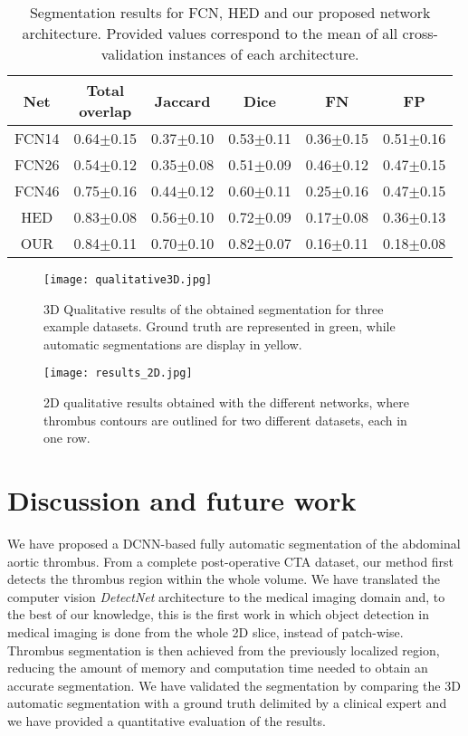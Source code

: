 \documentclass[preprint,authoryear,12pt]{elsarticle}
\begin{document}
\begin{table}[htb]
\centering
\begin{tabular}{c|c|c|c|c|c}
\hline
Net & \thead{Total \\ overlap} & Jaccard & Dice & FN & FP \\
\hline
FCN14 & 0.64\(\pm\)0.15 & 0.37\(\pm\)0.10 & 0.53\(\pm\)0.11 & 0.36\(\pm\)0.15 & 0.51\(\pm\)0.16 \\
FCN26 & 0.54\(\pm\)0.12 & 0.35\(\pm\)0.08 &  0.51\(\pm\)0.09 & 0.46\(\pm\)0.12 & 0.47\(\pm\)0.15\\
FCN46 & 0.75\(\pm\)0.16 &  0.44\(\pm\)0.12 & 0.60\(\pm\)0.11 & 0.25\(\pm\)0.16 & 0.47\(\pm\)0.15\\
HED & 0.83\(\pm\)0.08 & 0.56\(\pm\)0.10 & 0.72\(\pm\)0.09 & 0.17\(\pm\)0.08 & 0.36\(\pm\)0.13  \\
OUR & 0.84\(\pm\)0.11 & 0.70\(\pm\)0.10 & 0.82\(\pm\)0.07 & 0.16\(\pm\)0.11 &  0.18\(\pm\)0.08
\end{tabular}
\caption{\label{tab:results}Segmentation results for FCN, HED and our proposed network architecture. Provided values correspond to the mean of all cross-validation instances of each architecture.}
\end{table}


\begin{figure}[htb]
\centering
\texttt{[image: qualitative3D.jpg]}
\caption{\label{fig:qua_res}3D Qualitative results of the obtained segmentation for three example datasets. Ground truth are represented in green, while automatic segmentations are display in yellow.}
\end{figure}

\begin{figure}[htb]
\centering
\texttt{[image: results\_2D.jpg]}
\caption{\label{fig:res2D}2D qualitative results obtained with the different networks, where thrombus contours are outlined for two different datasets, each in one row.}
\end{figure}


\section{Discussion and future work}
\label{sec:disc}
We have proposed a DCNN-based fully automatic segmentation of the abdominal aortic thrombus. From a complete post-operative CTA dataset, our method first detects the thrombus region within the whole volume. We have translated the computer vision \textit{DetectNet} architecture to the medical imaging domain and, to the best of our knowledge, this is the first work in which object detection in medical imaging is done from the whole 2D slice, instead of patch-wise. Thrombus segmentation is then achieved from the previously localized region, reducing the amount of memory and computation time needed to obtain an accurate segmentation. We have validated the segmentation by comparing the 3D automatic segmentation with a ground truth delimited by a clinical expert and we have provided a quantitative evaluation of the results. 
\end{document}

